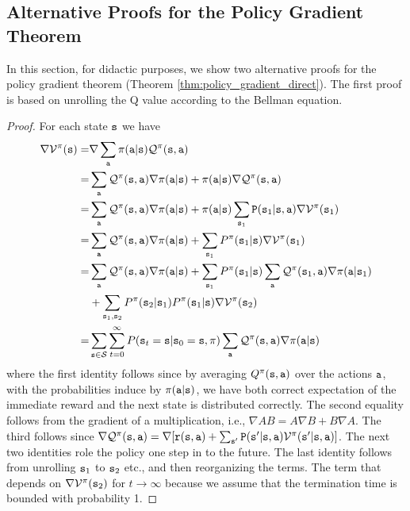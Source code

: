 \subsection{Alternative Proofs for the Policy Gradient Theorem}
In this section, for didactic purposes, we show two alternative proofs for the policy gradient theorem (Theorem \ref{thm:policy_gradient_direct}). The first proof is based on unrolling the Q value according to the Bellman equation.

\begin{proof}
For each state ${\tt s}$ we have
\begin{align*}
\nabla \mathcal{V}^\pi({\tt s}) =& \nabla \sum_{\tt a} \pi({\tt a}|{\tt s}) \mathcal{Q}^\pi({\tt s},{\tt a})\\
=&\sum_{\tt a}  \mathcal{Q}^\pi({\tt s},{\tt a}) \nabla \pi({\tt a}|{\tt s}) + \pi({\tt a}|{\tt s}) \nabla \mathcal{Q}^\pi({\tt s},{\tt a})\\
=&\sum_{\tt a}  \mathcal{Q}^\pi({\tt s},{\tt a}) \nabla \pi({\tt a}|{\tt s}) + \pi({\tt a}|{\tt s}) \sum_{{\tt s}_1} {\tt P}({\tt s}_1|{\tt s},{\tt a}) \nabla \mathcal{V}^\pi({\tt s}_1)\\
=& \sum_{\tt a}  \mathcal{Q}^\pi({\tt s},{\tt a}) \nabla
\pi({\tt a}|{\tt s}) + \sum_{{\tt s}_1} P^{\pi}({\tt s}_1|{\tt s})
\nabla \mathcal{V}^\pi({\tt s}_1)\\
=& \sum_{\tt a}  \mathcal{Q}^\pi({\tt s},{\tt a}) \nabla
\pi({\tt a}|{\tt s}) + \sum_{{\tt s}_1} P^{\pi}({\tt s}_1|{\tt s})
\sum_{\tt a} \mathcal{Q}^\pi({\tt s}_1,{\tt a}) \nabla
\pi({\tt a}|{\tt s}_1) \\
& + \sum_{{\tt s}_1, {\tt s}_2}
P^{\pi}({\tt s}_2|{\tt s}_1)P^{\pi}({\tt s}_1|{\tt s})
\nabla \mathcal{V}^\pi({\tt s}_2)\\
=& \sum_{{\tt s}\in
\mathcal{S}}\sum_{t=0}^\infty P({\tt s}_t = {\tt s} | {\tt s}_0 = {\tt s}, \pi) \sum_{\tt a}
\mathcal{Q}^\pi({\tt s},{\tt a})\nabla\pi({\tt a}|{\tt s})
\end{align*}
where the first identity follows since by averaging $Q^\pi({\tt s},{\tt a})$ over the actions ${\tt a}$, with the
probabilities induce by $\pi({\tt a}|{\tt s})$, we have both correct expectation of the immediate reward and the next state is distributed correctly. The second equality follows from the gradient of a multiplication, i.e., $\nabla AB=A\nabla B+B\nabla A$. The third follows since 
$\nabla \mathcal{Q}^\pi({\tt s},{\tt a})= \nabla
[{\tt r}({\tt s},{\tt a})+
\sum_{{\tt s}'}{\tt P}({\tt s}'|{\tt s},{\tt a})\mathcal{V}^\pi({\tt s}'|{\tt s},{\tt a})]$.
%
The next two identities role the policy one step in to the future.
%
The last identity follows from unrolling ${\tt s}_1$ to ${\tt s}_2$ etc., and then reorganizing the terms. The term that depends on $\nabla \mathcal{V}^\pi({\tt s}_2)$ for $t\to\infty$ because we assume that the termination time is bounded with probability 1.


\end{proof}
